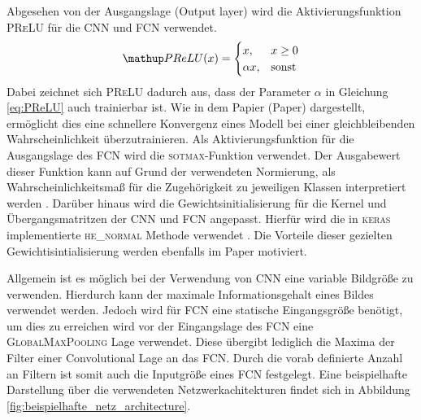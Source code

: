Abgesehen von der Ausgangslage (Output layer) wird die Aktivierungsfunktion
\textsc{PReLU} für die CNN und FCN verwendet.
\begin{equation}
  \label{eq:PReLU}
  \map{PReLU}(x)= \begin{cases} x,      & x \ge 0\\
                                \alpha x, & \mathrm{sonst}
                  \end{cases}
\end{equation}
Dabei zeichnet sich \textsc{PReLU} dadurch aus, dass der Parameter $\alpha$ in
Gleichung \eqref{eq:PReLU} auch trainierbar ist. Wie in dem Papier (Paper) \cite{he_normal_PReLU}
dargestellt, ermöglicht dies eine schnellere Konvergenz eines Modell
bei einer gleichbleibenden Wahrscheinlichkeit überzutrainieren.
Als Aktivierungsfunktion für die Ausgangslage
des FCN wird die \textsc{sotmax}-Funktion verwendet. Der Ausgabewert dieser
Funktion kann auf Grund der verwendeten Normierung, als Wahrscheinlichkeitsmaß
für die Zugehörigkeit zu jeweiligen Klassen interpretiert werden \cite[S. 139]{hands_on_machine_learning}.
Darüber hinaus wird die Gewichtsinitialisierung für die Kernel und
Übergangsmatritzen der CNN und FCN angepasst. Hierfür wird die
in \textsc{keras} implementierte \textsc{he\_normal} Methode
verwendet \cite{keras_he_normal}. Die Vorteile dieser gezielten
Gewichtisintialisierung werden ebenfalls im Paper \cite{he_normal_PReLU} motiviert.

Allgemein ist es möglich bei der Verwendung von CNN eine variable Bildgröße
zu verwenden. Hierdurch kann der maximale Informationsgehalt eines Bildes
verwendet werden. Jedoch wird für FCN eine statische Eingangsgröße benötigt,
um dies zu erreichen wird vor der Eingangslage des FCN eine \textsc{GlobalMaxPooling}
Lage verwendet. Diese übergibt lediglich die Maxima der Filter einer Convolutional Lage
an das FCN.
Durch die vorab definierte Anzahl an Filtern ist somit auch die Inputgröße eines
FCN festgelegt.
Eine beispielhafte Darstellung über die verwendeten Netzwerkachitekturen findet sich
in Abbildung \ref{fig:beispielhafte_netz_architecture}.

